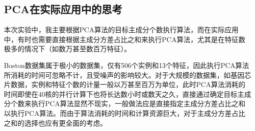 \documentclass[12pt,a4paper]{article}
\theoremstyle{definition}
\begin{document}
\subsection{PCA在实际应用中的思考}
\label{sec:dis}

本次实验中，我主要根据PCA算法的目标主成分个数执行算法，而在实际应用中，有时也需要直接根据主成分方差占比之和来执行PCA算法，尤其是在特征数极多的情况下（如数万甚至数百万特征）。

Boston数据集属于极小的数据集，仅有506个实例和13个特征，因此执行PCA算法所消耗的时间可忽略不计，且受噪声的影响较大。对于大规模的数据集，如基因芯片数据，实例和特征个数的计量一般以万甚至百万为单位，此时PCA算法消耗的时间即使在40核的并行计算下也将长达数小时或数天之久，直接通过确定目标主成分个数来执行PCA算法显然不现实，一般做法应是直接指定主成分方差占比之和以执行PCA算法。而由于算法消耗的时间和计算资源巨大，对于主成分方差占比之和的选择也应有更全面的考虑。
\end{document}
